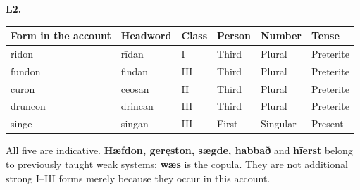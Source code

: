 \par\begin{minipage}{\linewidth}\raggedright
\textbf{L2.}

\par\begingroup
\fontsize{10.5}{13.2}\selectfont
\setlength{\LTleft}{0pt}\setlength{\LTright}{\fill}
\noindent
\begin{tabular}{@{}>{\raggedright\arraybackslash}p{21.85mm}>{\raggedright\arraybackslash}p{17.62mm}>{\raggedright\arraybackslash}p{17.62mm}>{\raggedright\arraybackslash}p{17.62mm}>{\raggedright\arraybackslash}p{17.62mm}>{\raggedright\arraybackslash}p{17.62mm}@{}}
\toprule
\textbf{Form in the account} & \textbf{Headword} & \textbf{Class} & \textbf{Person} & \textbf{Number} & \textbf{Tense} \\
\midrule
ridon & rīdan & I & Third & Plural & Preterite \\
fundon & findan & III & Third & Plural & Preterite \\
curon & cēosan & II & Third & Plural & Preterite \\
druncon & drincan & III & Third & Plural & Preterite \\
singe & singan & III & First & Singular & Present \\
\bottomrule
\end{tabular}
\par\endgroup

All five are indicative. \textbf{Hæfdon, geręston, sægde, habbað} and \textbf{hīerst} belong to previously taught weak systems; \textbf{wæs} is the copula. They are not additional strong I–III forms merely because they occur in this account.

\end{minipage}\par\addvspace{4pt}

